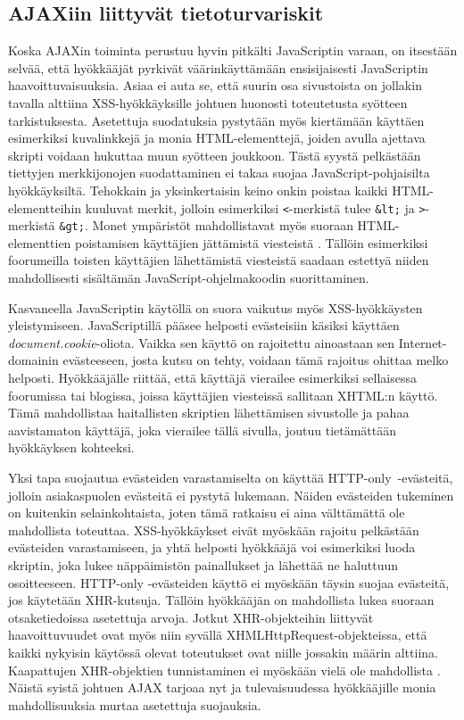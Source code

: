 \subsection{AJAXiin liittyvät tietoturvariskit}

Koska AJAXin toiminta perustuu hyvin pitkälti JavaScriptin varaan, on itsestään selvää, että hyökkääjät pyrkivät väärinkäyttämään ensisijaisesti JavaScriptin haavoittuvaisuuksia.  
Asiaa ei auta se, että suurin osa sivustoista on jollakin tavalla alttiina XSS-hyökkäyksille \cite{WEB2c} johtuen huonosti toteutetusta syötteen tarkistuksesta. Asetettuja suodatuksia 
pystytään myös kiertämään käyttäen esimerkiksi kuvalinkkejä ja monia HTML-elementtejä, joiden avulla ajettava skripti voidaan hukuttaa muun syötteen joukkoon. Tästä syystä pelkästään 
tiettyjen merkkijonojen suodattaminen ei takaa suojaa JavaScript-pohjaisilta hyökkäyksiltä. Tehokkain ja yksinkertaisin keino onkin poistaa kaikki HTML-elementteihin kuuluvat merkit, 
jolloin esimerkiksi \texttt{<}-merkistä tulee \texttt{\&lt;} ja \texttt{>}-merkistä \texttt{\&gt;}. Monet ympäristöt mahdollistavat myös suoraan HTML-elementtien poistamisen käyttäjien
jättämistä viesteistä \cite{AJAX}. Tällöin esimerkiksi foorumeilla toisten käyttäjien lähettämistä viesteistä saadaan estettyä niiden mahdollisesti sisältämän JavaScript-ohjelmakoodin
suorittaminen.

Kasvaneella JavaScriptin käytöllä on suora vaikutus myös XSS-hyökkäysten yleistymiseen. JavaScriptillä pääsee helposti evästeisiin käsiksi käyttäen \emph{document.cookie}-oliota. 
Vaikka sen käyttö on rajoitettu ainoastaan sen Internet-domainin evästeeseen, josta kutsu on tehty, voidaan tämä rajoitus ohittaa melko helposti. Hyökkääjälle riittää, että käyttäjä 
vierailee esimerkiksi sellaisessa foorumissa tai blogissa, joissa käyttäjien viesteissä sallitaan XHTML:n käyttö. Tämä mahdollistaa haitallisten skriptien lähettämisen sivustolle ja pahaa
aavistamaton käyttäjä, joka vierailee tällä sivulla, joutuu tietämättään hyökkäyksen kohteeksi.

Yksi tapa suojautua evästeiden varastamiselta on käyttää HTTP-only~-evästeitä, jolloin asiakaspuolen evästeitä ei pystytä lukemaan. Näiden evästeiden tukeminen on kuitenkin selainkohtaista,
joten tämä ratkaisu ei aina välttämättä ole mahdollista toteuttaa. XSS-hyökkäykset eivät myöskään rajoitu pelkästään evästeiden varastamiseen, ja yhtä helposti hyökkääjä voi esimerkiksi
luoda skriptin, joka lukee näppäimistön painallukset ja lähettää ne haluttuun osoitteeseen. HTTP-only -evästeiden käyttö ei myöskään täysin suojaa evästeitä, jos käytetään XHR-kutsuja. 
Tällöin hyökkääjän on mahdollista lukea suoraan otsaketiedoissa asetettuja arvoja. Jotkut XHR-objekteihin liittyvät haavoittuvuudet ovat myös niin syvällä XHMLHttpRequest-objekteissa, että 
kaikki nykyisin käytössä olevat toteutukset ovat niille jossakin määrin alttiina. Kaapattujen XHR-objektien tunnistaminen ei myöskään vielä ole mahdollista \cite{AJAX}. Näistä syistä johtuen 
AJAX tarjoaa nyt ja tulevaisuudessa hyökkääjille monia mahdollisuuksia murtaa asetettuja suojauksia.

